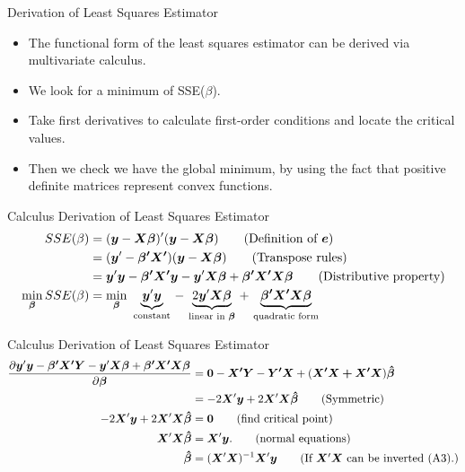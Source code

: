 \documentclass[aspectratio=169, handout]{beamer}
\numberwithin{equation}{section}
\begin{document}
\begin{frame}{Derivation of Least Squares Estimator}
\begin{itemize}
\item The functional form of the least squares estimator can be derived via multivariate calculus.
\item We look for a minimum of SSE($\beta$).
\item Take first derivatives to calculate first-order conditions and locate the critical values.
\item Then we check we have the global minimum, by using the fact that positive definite matrices represent convex functions.
\end{itemize}
\end{frame}


\begin{frame}{Calculus Derivation of Least Squares Estimator}
\begin{align*}
SSE(\beta)&=(\bm{y}-\bm{X\beta})'(\bm{y}-\bm{X\beta}) \tag{Definition of $\bm{e}$}\\
&=(\bm{y}'-\bm{\beta'X'})(\bm{y}-\bm{X\beta}) \tag{Transpose rules}\\
&=\bm{y}'\bm{y}-\bm{\beta'X'y}-\bm{y}'\bm{X\beta}+\bm{\beta'X'X\beta}  \tag{Distributive property}\\
\min_{\bm{\beta}} SSE(\beta)&=\min_{\bm{\beta}}\ \underbrace{\bm{y}'\bm{y}}_{\text{constant}}\,-\,\underbrace{2\bm{y}'\bm{X\beta}}_{\text{linear in }\bm{\beta}}\,+\,\underbrace{\bm{\beta'X'X\beta}}_{\text{quadratic form}}
\end{align*}
\end{frame}

\begin{frame}{Calculus Derivation of Least Squares Estimator}
\begin{align*}
\frac{\partial\bm{y}'\bm{y}-\bm{\beta'X'Y}-\bm{y}'\bm{X\beta}+\bm{\beta'X'X\beta}}{\partial\bm{\beta}}&=\bm{0}-\bm{X'Y}-\bm{Y'X}+(\bm{X'X+X'X})\bm{\hat{\beta}}\\
&=-2\bm{X}'\bm{y}+2\bm{X}'\bm{X}\bm{\hat{\beta}} \tag{Symmetric}\\
-2\bm{X}'\bm{y}+2\bm{X}'\bm{X}\bm{\hat{\beta}}&=\bm{0} \tag{find critical point}\\
\bm{X}'\bm{X}\bm{\hat{\beta}}&=\bm{X}'\bm{y}. \tag{normal equations}\\
\bm{\hat{\beta}}&=(\bm{X}'\bm{X})^{-1}\bm{X}'\bm{y} \tag{If $\bm{X}'\bm{X}$ can be inverted (A3).}
\end{align*}
\end{frame}
\end{document}
